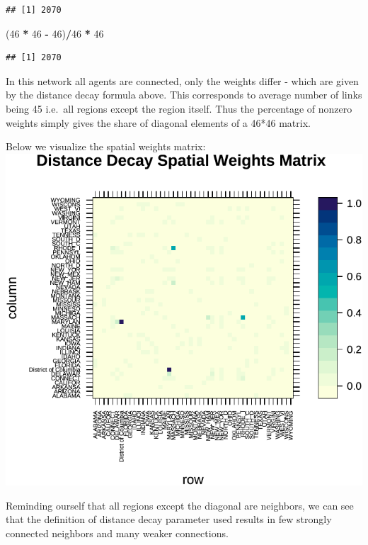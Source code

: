 \documentclass[
  a4paper,
]{article}
\newenvironment{Shaded}{\begin{snugshade}}{\end{snugshade}}
\newcommand{\DecValTok}[1]{\textcolor[rgb]{0.00,0.00,0.81}{#1}}
\newcommand{\NormalTok}[1]{#1}
\newcommand{\SpecialCharTok}[1]{\textcolor[rgb]{0.81,0.36,0.00}{\textbf{#1}}}
\begin{document}
\begin{verbatim}
## [1] 2070
\end{verbatim}

\begin{Shaded}
\begin{Highlighting}[]
\NormalTok{(}\DecValTok{46} \SpecialCharTok{*} \DecValTok{46} \SpecialCharTok{{-}} \DecValTok{46}\NormalTok{)}\SpecialCharTok{/}\DecValTok{46} \SpecialCharTok{*} \DecValTok{46}
\end{Highlighting}
\end{Shaded}

\begin{verbatim}
## [1] 2070
\end{verbatim}

In this network all agents are connected, only the weights differ -
which are given by the distance decay formula above. This corresponds to
average number of links being 45 i.e.~all regions except the region
itself. Thus the percentage of nonzero weights simply gives the share of
diagonal elements of a 46*46 matrix.

Below we visualize the spatial weights matrix:
\includegraphics{03_assignment_files/figure-latex/unnamed-chunk-13-1.pdf}

Reminding ourself that all regions except the diagonal are neighbors, we
can see that the definition of distance decay parameter used results in
few strongly connected neighbors and many weaker connections.
\end{document}
